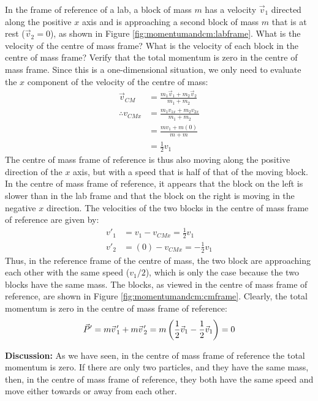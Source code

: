 \begin{example}{ In the frame of reference of a lab, a block of mass $m$ has a velocity $\vec v_1$ directed along the positive $x$ axis and is approaching a second block of mass $m$ that is at rest ($\vec v_2=0$), as shown in Figure \ref{fig:momentumandcm:labframe}. What is the velocity of the centre of mass frame? What is the velocity of each block in the centre of mass frame? Verify that the total momentum is zero in the centre of mass frame.}
Since this is a one-dimensional situation, we only need to evaluate the $x$ component of the velocity of the centre of mass:
\begin{align*}
\vec v_{CM} &= \frac{m_1\vec v_1 + m_2\vec v_2 }{m_1+m_2}\\
\therefore v_{CMx} &= \frac{m_1 v_{1x} + m_2 v_{2x}}{m_1+m_2}\\
&=\frac{mv_1 + m(0) }{m+m}\\
&=\frac{1}{2}v_1
\end{align*}
The centre of mass frame of reference is thus also moving along the positive direction of the $x$ axis, but with a speed that is half of that of the moving block. In the centre of mass frame of reference, it appears that the block on the left is slower than in the lab frame and that the block on the right is moving in the negative $x$ direction. The velocities of the two blocks in the centre of mass frame of reference are given by:
\begin{align*}
v'_1&=v_1-v_{CMx}=\frac{1}{2}v_1\\
v'_2&=(0)-v_{CMx}=-\frac{1}{2}v_1
\end{align*}
Thus, in the reference frame of the centre of mass, the two block are approaching each other with the same speed ($v_1/2$), which is only the case because the two blocks have the same mass. The blocks, as viewed in the centre of mass frame of reference, are shown in Figure \ref{fig:momentumandcm:cmframe}.
Clearly, the total momentum is zero in the centre of mass frame of reference:
\begin{align*}
\vec P' = m\pvec v'_1+ m\pvec v'_2 = m \left(\frac{1}{2}\vec v_1 - \frac{1}{2}\vec v_1\right) = 0
\end{align*}

\textbf{Discussion:} As we have seen, in the centre of mass frame of reference the total momentum is zero. If there are only two particles, and they have the same mass, then, in the centre of mass frame of reference, they both have the same speed and move either towards or away from each other. 
\end{example}



